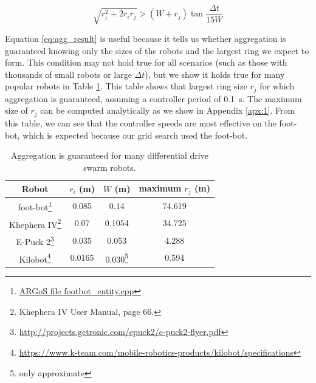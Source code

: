 \documentclass[conference]{IEEEtran}
\begin{document}
    \begin{equation} \label{eq:agg_result}
      \sqrt{r^2_i + 2r_ir_j} > (W+r_j)\tan{\frac{\Delta t}{15W}}
    \end{equation}

    Equation \eqref{eq:agg_result} is useful because it tells us whether aggregation is guaranteed knowing only the sizes of the robots and the largest ring we expect to form. This condition may not hold true for all scenarios (such as those with thousands of small robots or large $\Delta t$), but we show it holds true for many popular robots in Table \ref{table:robots}. This table shows that largest ring size $r_j$ for which aggregation is guaranteed, assuming a controller period of \SI{0.1}{\second}. The maximum size of $r_j$ can be computed analytically as we show in Appendix \ref{apx:1}. From this table, we can see that the controller speeds are most effective on the foot-bot, which is expected because our grid search used the foot-bot.

    \begin{savenotes}
    \begin{table}
      \centering
      \caption{Aggregation is guaranteed for many differential drive swarm robots.}
      \begin{tabular}{|c|c|c|c|} \hline
        Robot & $r_i$ (m) & $W$ (m) & maximum $r_j$ (m) \\ \hline
        foot-bot\footnote{\href{https://github.com/ilpincy/argos3/blob/master/src/plugins/robots/foot-bot/simulator/footbot_entity.cpp}{ARGoS file footbot\_entity.cpp}} &
            0.085 & 0.14 & 74.619 \\ \hline
        Khephera IV\footnote{Khephera IV User Manual, page 66.} &
            0.07 & 0.1054 & 34.725 \\ \hline
        E-Puck 2\footnote{\href{http://projects.gctronic.com/epuck2/e-puck2-flyer.pdf}{http://projects.gctronic.com/epuck2/e-puck2-flyer.pdf}} &
            0.035 & 0.053 & 4.288 \\ \hline
        Kilobot\footnote{\href{https://www.k-team.com/mobile-robotics-products/kilobot/specifications}{https://www.k-team.com/mobile-robotics-products/kilobot/specifications}} &
            0.0165 & 0.030\footnote{only approximate} & 0.594 \\ \hline
      \end{tabular}
      \label{table:robots}
    \end{table}
    \end{savenotes}
\end{document}

